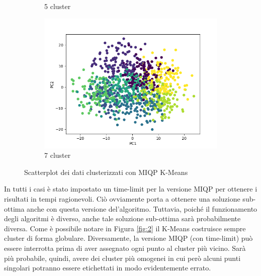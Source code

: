 \documentclass{article}
\begin{document}
\begin{figure}[h]
\begin{subfigure}[b]{0.32\linewidth}
         \caption{5 cluster}
     \end{subfigure}
     \begin{subfigure}[b]{0.32\linewidth}
         \centering
         \includegraphics[width=\linewidth]{../results/plots/scatter_k7}
         \caption{7 cluster}
     \end{subfigure}
     \caption{Scatterplot dei dati clusterizzati con MIQP K-Means}
     \label{fig:1}
    \end{figure}
    In tutti i casi è stato impostato un time-limit per la versione MIQP per ottenere i risultati in tempi ragionevoli. Ciò ovviamente porta a ottenere una soluzione sub-ottima anche con questa versione del'algoritmo. Tuttavia, poiché il funzionamento degli algoritmi è diverso, anche tale soluzione sub-ottima sarà probabilmente diversa. Come è possibile notare in Figura \ref{fig:2} il K-Means costruisce sempre cluster di forma globulare. Diversamente, la versione MIQP (con time-limit) può essere interrotta prima di aver assegnato ogni punto al cluster più vicino. Sarà più probabile, quindi, avere dei cluster più omogenei in cui però alcuni punti singolari potranno essere etichettati in modo evidentemente errato.
\end{document}
